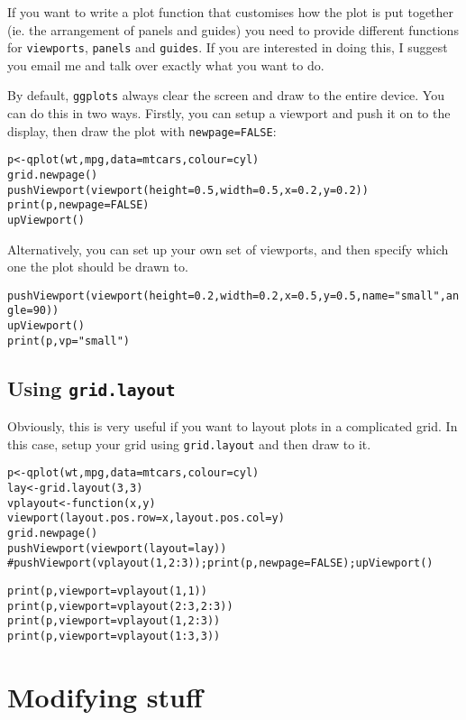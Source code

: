 If you want to write a plot function that customises how the plot is put together (ie. the arrangement of panels and guides) you need to provide different functions for {\tt viewports}, {\tt panels} and {\tt guides}.  If you are interested in doing this, I suggest you email me and talk over exactly what you want to do.

By default, {\tt ggplots} always clear the screen and draw to the entire device.  You can do this in two ways.  Firstly, you can setup a viewport and push it on to the display, then draw the plot with {\tt newpage=FALSE}:

\begin{alltt}
p <- qplot(wt, mpg, data=mtcars, colour=cyl)
grid.newpage()
pushViewport(viewport(height=0.5, width=0.5, x=0.2, y=0.2))
print(p, newpage=FALSE)
upViewport()
\end{alltt}

Alternatively, you can set up your own set of viewports, and then specify which one the plot should be drawn to.

\begin{alltt}
pushViewport(viewport(height=0.2, width=0.2, x=0.5, y=0.5, name="small", angle=90))
upViewport()
print(p, vp="small")
\end{alltt}

\subsection{Using {\tt grid.layout}}\label{sub:using_tt_grid_layout_}

Obviously, this is very useful if you want to layout plots in a complicated grid.  In this case, setup your grid using {\tt grid.layout} and then draw to it.

\begin{alltt}
p <- qplot(wt, mpg, data=mtcars, colour=cyl)
lay <- grid.layout(3,3)
vplayout <- function(x, y) 
  viewport(layout.pos.row=x, layout.pos.col=y)
grid.newpage()
pushViewport(viewport(layout=lay))
#pushViewport(vplayout(1,2:3)); print(p, newpage=FALSE); upViewport()

print(p, viewport=vplayout(1,1))
print(p, viewport=vplayout(2:3,2:3))
print(p, viewport=vplayout(1, 2:3))
print(p, viewport=vplayout(1:3, 3))
\end{alltt}


\section{Modifying stuff}\label{sec:modifying_stuff}

